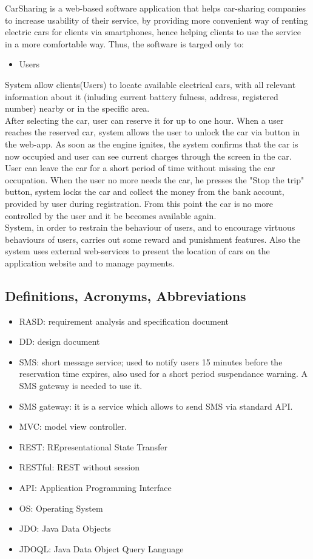 \documentclass[12pt, letterpaper]{article}
\begin{document}
CarSharing is a web-based software application that helps car-sharing companies to increase usability of their service, by providing more convenient way of renting electric cars for clients via smartphones, hence helping clients to use the service in a more comfortable way. Thus, the software is targed only to:
\begin{itemize}
	\item Users
\end{itemize}    

System allow clients(Users) to locate available electrical cars, with all relevant information about it (inluding current battery fulness, address, registered number) nearby or in the specific area. \\ 
After selecting the car, user can reserve it for up to one hour. When a user reaches the reserved car, system allows the user to unlock the car via button in the web-app. As soon as the engine ignites, the system confirms that the car is now occupied and user can see current charges through the screen in
the car. \\
User can leave the car for a short period of time without missing the car occupation. When the user no more needs the car, he presses the "Stop the trip" button, system locks the car and collect the money from the bank account, provided by user during registration. From this point the car is no more controlled by the user and it be becomes available again. \\
System, in order to restrain the behaviour of users, and to encourage virtuous behaviours of users, carries out some reward and punishment features.
Also the system uses external web-services to present the location of cars on the application website and to manage payments.   

\subsection{Definitions, Acronyms, Abbreviations}

\begin{itemize}
	\item RASD: requirement analysis and specification document 
	\item DD: design document
	\item SMS: short message service; used to notify users 15 minutes before the reservation time expires, also used for a short period suspendance warning. A SMS gateway is needed to use it.
	\item SMS gateway: it is a service which allows to send SMS via standard API.
	\item MVC: model view controller.
	\item REST: REpresentational State Transfer
	\item RESTful: REST without session
	\item API: Application Programming Interface
	\item OS: Operating System
	\item JDO: Java Data Objects
	\item JDOQL: Java Data Object Query Language
\end{itemize}
\end{document}
